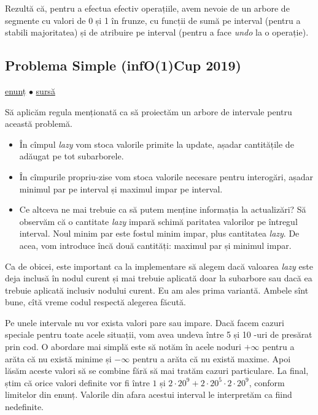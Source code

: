 \documentclass[../main.tex]{subfiles}
\begin{document}
Rezultă că, pentru a efectua efectiv operațiile, avem nevoie de un arbore de segmente cu valori de 0 și 1 în frunze, cu funcții de sumă pe interval (pentru a stabili majoritatea) și de atribuire pe interval (pentru a face \textit{undo} la o operație).

\subsection{Problema Simple (infO(1)Cup 2019)}
\label{problem:simple}

\href{https://kilonova.ro/problems/3424/}{enunț}
$\bullet$
\hyperref[code:simple]{sursă}

Să aplicăm regula menționată ca să proiectăm un arbore de intervale pentru această problemă.

\begin{itemize}
  \item În cîmpul \textit{lazy} vom stoca valorile primite la update, așadar cantitățile de adăugat pe tot subarborele.
  \item În cîmpurile propriu-zise vom stoca valorile necesare pentru interogări, așadar minimul par pe interval și maximul impar pe interval.
  \item Ce altceva ne mai trebuie ca să putem menține informația la actualizări? Să observăm că o cantitate \textit{lazy} impară schimă paritatea valorilor pe întregul interval. Noul minim par este fostul minim impar, plus  cantitatea \textit{lazy}. De acea, vom introduce încă două cantități: maximul par și minimul impar.
\end{itemize}

Ca de obicei, este important ca la implementare să alegem dacă valoarea \textit{lazy} este deja inclusă în nodul curent și mai trebuie aplicată doar la subarbore sau dacă ea trebuie aplicată inclusiv nodului curent. Eu am ales prima variantă. Ambele sînt bune, cîtă vreme codul respectă alegerea făcută.

Pe unele intervale nu vor exista valori pare sau impare. Dacă facem cazuri speciale pentru toate acele situații, vom avea undeva între 5 și 10 -uri de presărat prin cod. O abordare mai simplă este să notăm în acele noduri $+\infty$ pentru a arăta că nu există minime și $-\infty$ pentru a arăta că nu există maxime. Apoi lăsăm aceste valori să se combine fără să mai tratăm cazuri particulare. La final, știm că orice valori definite vor fi între $1$ și $2 \cdot 20^9 + 2 \cdot 20^5 \cdot 2 \cdot 20^9$, conform limitelor din enunț. Valorile din afara acestui interval le interpretăm ca fiind nedefinite.
\end{document}

